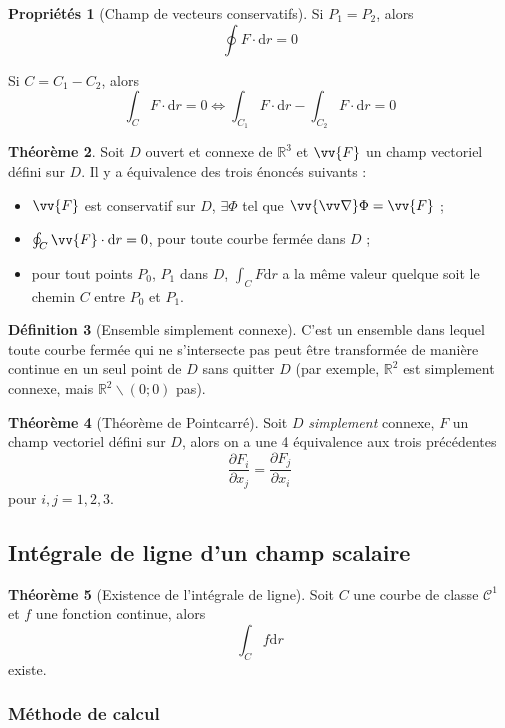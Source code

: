 \documentclass[11pt,a4paper]{article}
\theoremstyle{definition}
\newtheorem{mydef}{Définition}[section]
\newtheorem{myprop}[mydef]{Propriétés}
\newtheorem{mytheo}[mydef]{Théorème}
\newcommand{\R}{\mathbb{R}}
\newcommand{\dif}{\mathrm{d}}
\let\oldnabla\nabla
\renewcommand{\nabla}{\vv{\oldnabla}}
\newcommand{\pa}{\partial}
\begin{document}
\begin{myprop}[Champ de vecteurs conservatifs]
Si $P_1 = P_2$, alors
\[ \oint F \cdot \dif r = 0 \]

Si $C = C_1 - C_2$, alors
\[ \int_C F \cdot \dif r = 0 \Leftrightarrow \int_{C_1} F \cdot \dif r - \int_{C_2} F \cdot \dif r = 0 \]
\end{myprop}

\begin{mytheo} Soit $D$ ouvert et connexe de $\R^3$ et $\vv{F}$ un champ vectoriel défini sur $D$. Il y a équivalence des trois énoncés suivants :
\begin{itemize}
\item $\vv{F}$ est conservatif sur $D$, $\exists \Phi$ tel que $\nabla \Phi = \vv{F}$ ;
\item $\oint_C \vv{F} \cdot \dif r = 0$, pour toute courbe fermée dans $D$ ;
\item pour tout points $P_0$, $P_1$ dans $D$, $\int_C F \dif r$ a la même valeur quelque soit le chemin $C$ entre $P_0$ et $P_1$.
\end{itemize}
\end{mytheo}

\begin{mydef}[Ensemble simplement connexe] C'est un ensemble dans lequel toute courbe fermée qui ne s'intersecte pas peut être transformée de manière continue en un seul point de $D$ sans quitter $D$ (par exemple, $\R^2$ est simplement connexe, mais $\R^2\backslash (0;0)$ pas).
\end{mydef}

\begin{mytheo}[Théorème de Pointcarré] Soit $D$ \emph{simplement} connexe, $F$ un champ vectoriel défini sur $D$, alors on a une 4\ieme{} équivalence aux trois précédentes
\[ \frac{\pa F_i}{\pa x_j} = \frac{\pa F_j}{\pa x_i} \]
pour $i,j = 1,2,3$.
\end{mytheo}

\subsection{Intégrale de ligne d'un champ scalaire}

\begin{mytheo}[Existence de l'intégrale de ligne]
Soit $C$ une courbe de classe $\mathcal{C}^1$ et $f$ une fonction continue, alors
\[ \int_C f \dif r \]
existe.
\end{mytheo}

\subsubsection{Méthode de calcul}
\end{document}
